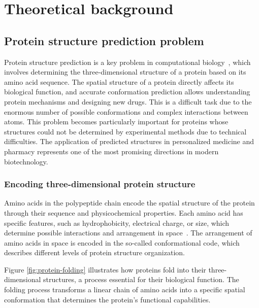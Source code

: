 \chapter{Theoretical background}


\section{Protein structure prediction problem}
Protein structure prediction is a key problem in computational biology~\cite{alphafold3}, which involves determining the three-dimensional structure of a protein based on its amino acid sequence.
The spatial structure of a protein directly affects its biological function, and accurate conformation prediction allows understanding protein mechanisms and designing new drugs.
This is a difficult task due to the enormous number of possible conformations and complex interactions between atoms.
This problem becomes particularly important for proteins whose structures could not be determined by experimental methods due to technical difficulties.
The application of predicted structures in personalized medicine and pharmacy represents one of the most promising directions in modern biotechnology.

\subsection{Encoding three-dimensional protein structure}
Amino acids in the polypeptide chain encode the spatial structure of the protein through their sequence and physicochemical properties.
Each amino acid has specific features, such as hydrophobicity, electrical charge, or size, which determine possible interactions and arrangement in space~\cite{protein_folding}.
The arrangement of amino acids in space is encoded in the so-called conformational code, which describes different levels of protein structure organization.

Figure \ref{fig:protein-folding} illustrates how proteins fold into their three-dimensional structures, a process essential for their biological function.
The folding process transforms a linear chain of amino acids into a specific spatial conformation that determines the protein's functional capabilities.

